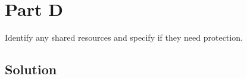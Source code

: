 \section*{Part D}

Identify any shared resources and specify if they need protection.

\subsection*{Solution}

